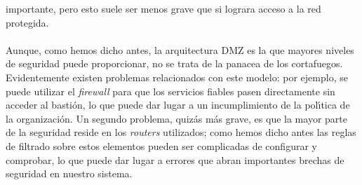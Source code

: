 importante, pero esto suele ser menos grave que si lograra acceso a la red
protegida.\\
\\Aunque, como hemos dicho antes, la arquitectura DMZ es la que mayores niveles
de seguridad puede proporcionar, no se trata de la panacea de los cortafuegos.
Evidentemente existen problemas relacionados con este modelo: por ejemplo, se 
puede utilizar el {\it firewall} para que los servicios fiables pasen 
directamente sin acceder al basti\'on, lo que puede dar lugar a un 
incumplimiento de la pol\'{\i}tica de la organizaci\'on. Un segundo problema,
quiz\'as m\'as grave, es que la mayor parte de la seguridad reside en los {\it
routers} utilizados; como hemos dicho antes las reglas de filtrado sobre 
estos elementos pueden ser complicadas de configurar y comprobar, lo que puede
dar lugar a errores que abran importantes brechas de seguridad en nuestro 
sistema.\\
